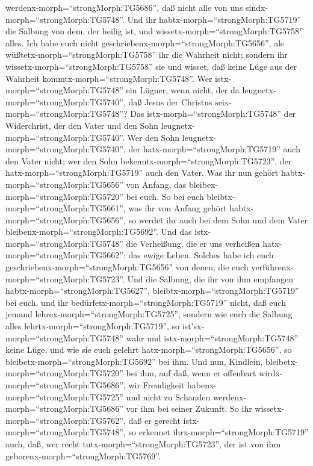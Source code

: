 werdenx-morph=``strongMorph:TG5686'', daß nicht alle von uns
sindx-morph=``strongMorph:TG5748''.  Und ihr
habtx-morph=``strongMorph:TG5719'' die Salbung von dem, der heilig ist,
und wissetx-morph=``strongMorph:TG5758'' alles.  Ich habe
euch nicht geschriebenx-morph=``strongMorph:TG5656'', als
wüßtetx-morph=``strongMorph:TG5758'' ihr die Wahrheit nicht; sondern ihr
wissetx-morph=``strongMorph:TG5758'' sie und wisset, daß keine Lüge aus
der Wahrheit kommtx-morph=``strongMorph:TG5748''.  Wer
istx-morph=``strongMorph:TG5748'' ein Lügner, wenn nicht, der da
leugnetx-morph=``strongMorph:TG5740'', daß Jesus der Christus
seix-morph=``strongMorph:TG5748''? Das istx-morph=``strongMorph:TG5748''
der Widerchrist, der den Vater und den Sohn
leugnetx-morph=``strongMorph:TG5740''.  Wer den Sohn
leugnetx-morph=``strongMorph:TG5740'', der
hatx-morph=``strongMorph:TG5719'' auch den Vater nicht; wer den Sohn
bekenntx-morph=``strongMorph:TG5723'', der
hatx-morph=``strongMorph:TG5719'' auch den Vater.  Was ihr
nun gehört habtx-morph=``strongMorph:TG5656'' von Anfang, das
bleibex-morph=``strongMorph:TG5720'' bei euch. So bei euch
bleibtx-morph=``strongMorph:TG5661'', was ihr von Anfang gehört
habtx-morph=``strongMorph:TG5656'', so werdet ihr auch bei dem Sohn und
dem Vater bleibenx-morph=``strongMorph:TG5692''.  Und das
istx-morph=``strongMorph:TG5748'' die Verheißung, die er uns verheißen
hatx-morph=``strongMorph:TG5662'': das ewige Leben. 
Solches habe ich euch geschriebenx-morph=``strongMorph:TG5656'' von
denen, die euch verführenx-morph=``strongMorph:TG5723''. 
Und die Salbung, die ihr von ihm empfangen
habtx-morph=``strongMorph:TG5627'', bleibtx-morph=``strongMorph:TG5719''
bei euch, und ihr bedürfetx-morph=``strongMorph:TG5719'' nicht, daß euch
jemand lehrex-morph=``strongMorph:TG5725''; sondern wie euch die Salbung
alles lehrtx-morph=``strongMorph:TG5719'', so
ist'sx-morph=``strongMorph:TG5748'' wahr und
istx-morph=``strongMorph:TG5748'' keine Lüge, und wie sie euch gelehrt
hatx-morph=``strongMorph:TG5656'', so
bleibetx-morph=``strongMorph:TG5692'' bei ihm.  Und nun,
Kindlein, bleibetx-morph=``strongMorph:TG5720'' bei ihm, auf daß, wenn
er offenbart wirdx-morph=``strongMorph:TG5686'', wir Freudigkeit
habenx-morph=``strongMorph:TG5725'' und nicht zu Schanden
werdenx-morph=``strongMorph:TG5686'' vor ihm bei seiner Zukunft.
 So ihr wissetx-morph=``strongMorph:TG5762'', daß er
gerecht istx-morph=``strongMorph:TG5748'', so erkennet
ihrx-morph=``strongMorph:TG5719'' auch, daß, wer recht
tutx-morph=``strongMorph:TG5723'', der ist von ihm
geborenx-morph=``strongMorph:TG5769''.


